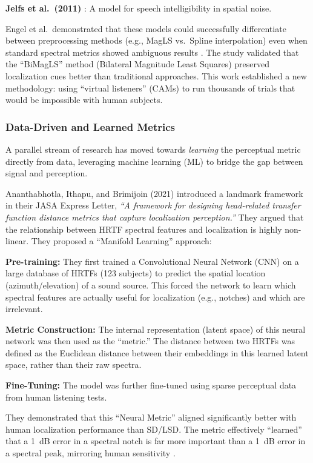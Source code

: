 \documentclass[12pt,a4paper]{article}
\begin{document}
\textbf{Jelfs et al.\ (2011)} \cite{jelfs2011}: A model for speech intelligibility in spatial noise.

Engel et al.\ demonstrated that these models could successfully differentiate between preprocessing methods (e.g., MagLS vs.\ Spline interpolation) even when standard spectral metrics showed ambiguous results \cite{engel2022}. The study validated that the ``BiMagLS'' method (Bilateral Magnitude Least Squares) preserved localization cues better than traditional approaches. This work established a new methodology: using ``virtual listeners'' (CAMs) to run thousands of trials that would be impossible with human subjects.

\subsubsection{Data-Driven and Learned Metrics}

A parallel stream of research has moved towards \textit{learning} the perceptual metric directly from data, leveraging machine learning (ML) to bridge the gap between signal and perception.

Ananthabhotla, Ithapu, and Brimijoin (2021) \cite{ananthabhotla2021} introduced a landmark framework in their JASA Express Letter, \textit{``A framework for designing head-related transfer function distance metrics that capture localization perception.''}  They argued that the relationship between HRTF spectral features and localization is highly non-linear. They proposed a ``Manifold Learning'' approach:

\textbf{Pre-training:} They first trained a Convolutional Neural Network (CNN) on a large database of HRTFs (123 subjects) to predict the spatial location (azimuth/elevation) of a sound source. This forced the network to learn which spectral features are actually useful for localization (e.g., notches) and which are irrelevant.

\textbf{Metric Construction:} The internal representation (latent space) of this neural network was then used as the ``metric.'' The distance between two HRTFs was defined as the Euclidean distance between their embeddings in this learned latent space, rather than their raw spectra.

\textbf{Fine-Tuning:} The model was further fine-tuned using sparse perceptual data from human listening tests.

They demonstrated that this ``Neural Metric'' aligned significantly better with human localization performance than SD/LSD. The metric effectively ``learned'' that a 1~dB error in a spectral notch is far more important than a 1~dB error in a spectral peak, mirroring human sensitivity \cite{ananthabhotla2021}.
\end{document}
